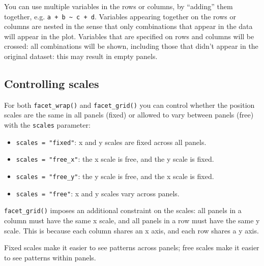 You can use multiple variables in the rows or columns, by ``adding''
them together, e.g. \texttt{a\ +\ b\ \textasciitilde{}\ c\ +\ d}.
Variables appearing together on the rows or columns are nested in the
sense that only combinations that appear in the data will appear in the
plot. Variables that are specified on rows and columns will be crossed:
all combinations will be shown, including those that didn't appear in
the original dataset: this may result in empty panels.

\subsection{Controlling scales}\label{sub:controlling-scales}

For both \texttt{facet\_wrap()} and \texttt{facet\_grid()} you can
control whether the position scales are the same in all panels (fixed)
or allowed to vary between panels (free) with the \texttt{scales}
parameter: 

\begin{itemize}
\tightlist
\item
  \texttt{scales\ =\ "fixed"}: x and y scales are fixed across all
  panels.
\item
  \texttt{scales\ =\ "free\_x"}: the x scale is free, and the y scale is
  fixed.
\item
  \texttt{scales\ =\ "free\_y"}: the y scale is free, and the x scale is
  fixed.
\item
  \texttt{scales\ =\ "free"}: x and y scales vary across panels.
\end{itemize}

\texttt{facet\_grid()} imposes an additional constraint on the scales:
all panels in a column must have the same x scale, and all panels in a
row must have the same y scale. This is because each column shares an x
axis, and each row shares a y axis.

Fixed scales make it easier to see patterns across panels; free scales
make it easier to see patterns within panels.

\begin{Shaded}
\begin{Highlighting}[]
\StringTok{ }\StringTok{ }
\StringTok{  }\NormalTok{() +}
\StringTok{  }\NormalTok{(} \NormalTok{, } \NormalTok{) }
\StringTok{ }
\end{Highlighting}
\end{Shaded}

